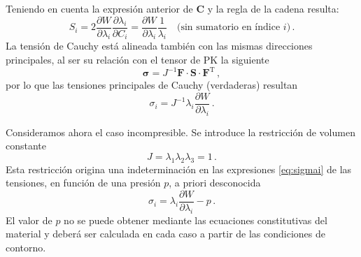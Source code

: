 Teniendo en cuenta la expresión anterior de 
$\bm{C}$ 
y la regla de la cadena resulta:
\begin{equation}
  S_i = 2 \frac{\partial W}{\partial \lambda_i}\frac{\partial\lambda_i}{\partial
  C_i} = \frac{\partial W}{\partial \lambda_i}\frac{1}{\lambda_i}
  \quad\text{(sin sumatorio en índice $i$)}
  \,.
  \label{eq:Si}
\end{equation}
La tensión de Cauchy está alineada también con las mismas direcciones principales, al ser su relación con el tensor de PK la siguiente
\begin{equation}
  \bm{\sigma} = J^{-1}\bm{F}\cdot\bm{S}\cdot\bm{F}^\text{T}
  \,,
\end{equation}
por lo que las tensiones principales de Cauchy (verdaderas) resultan
\begin{equation}
  \sigma_i = J^{-1} \lambda_i\frac{\partial W}{\partial\lambda_i}
  \,.
  \label{eq:sigmai}
\end{equation}

Consideramos ahora el caso incompresible. Se introduce la restricción de volumen constante
\begin{equation}
  J=\lambda_1\lambda_2\lambda_3 = 1
  \,.
  \label{eq:incomp}
\end{equation}
Esta restricción origina una indeterminación en las expresiones \eqref{eq:sigmai} de las tensiones, en función de una presión $p$, a priori desconocida
\begin{equation}
  \sigma_i = \lambda_i\frac{\partial W}{\partial\lambda_i} -p
  \,.
  \label{eq:sigmai-incomp}
\end{equation}
El valor de $p$ no se puede obtener mediante las ecuaciones constitutivas del material y  deberá ser calculada en cada caso a partir de las condiciones de contorno.

